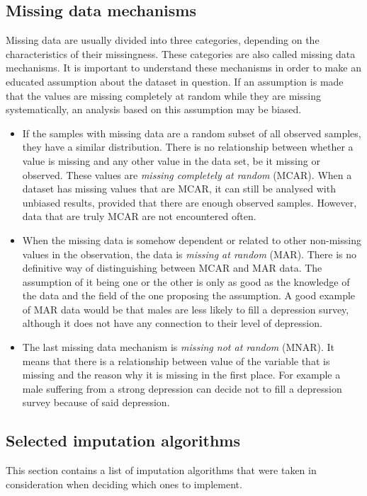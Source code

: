 \documentclass[11pt]{article}
\begin{document}
    \subsection{Missing data mechanisms}
      \label{sec:missmech}
      Missing data are usually divided into three categories, depending on the characteristics of their missingness. These categories are also called missing data mechanisms. \cite{lwd} It is important to understand these mechanisms in order to make an educated assumption about the dataset in question. If an assumption is made that the values are missing completely at random while they are missing systematically, an analysis based on this assumption may be biased.
      \begin{itemize}
      \item If the samples with missing data are a random subset of all observed samples, they have a similar distribution. There is no relationship between whether a value is missing and any other value in the data set, be it missing or observed. These values are {\it missing completely at random} (MCAR). \cite{lwd} When a dataset has missing values that are MCAR, it can still be analysed with unbiased results, provided that there are enough observed samples. However, data that are truly MCAR are not encountered often.
      \item When the missing data is somehow dependent or related to other non-missing values in the observation, the data is {\it missing at random} (MAR). \cite{lwd} There is no definitive way of distinguishing between MCAR and MAR data. The assumption of it being one or the other is only as good as the knowledge of the data and the field of the one proposing the assumption. A good example of MAR data would be that males are less likely to fill a depression survey, although it does not have any connection to their level of depression.
      \item The last missing data mechanism is {\it missing not at random} (MNAR). It means that there is a relationship between value of the variable that is missing and the reason why it is missing in the first place. For example a male suffering from a strong depression can decide not to fill a depression survey because of said depression.
      \end{itemize}
    \subsection{Selected imputation algorithms}
      This section contains a list of imputation algorithms that were taken in consideration when deciding which ones to implement.
\end{document}
